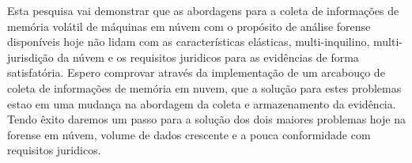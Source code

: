 \documentclass[12pt,				%
	openright,			%
	oneside,			%
	a4paper,			%
	english,			%
	brazil				%
	]{abntex2}
\begin{document}
\pagebreak

%
%

%


\setlength{\absparsep}{18pt} %
\begin{resumo}
Esta pesquisa vai demonstrar que as abordagens para a coleta de informações de memória volátil de máquinas em núvem com o propósito de análise forense disponíveis hoje não 
lidam com as características elásticas, multi-inquilino, multi-jurisdição da núvem e os requisitos juridicos para as evidências de forma satisfatória. Espero comprovar através
da implementação de um arcabouço de coleta de informações de memória em nuvem, que a solução para estes problemas estao em uma mudança na abordagem da coleta e armazenamento 
da evidência. Tendo êxito daremos um passo para a solução dos dois maiores problemas hoje na forense em núvem, volume de dados crescente e a pouca conformidade com requisitos juridicos.

 

\end{resumo}

%
%  


\end{document}
